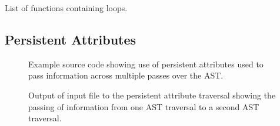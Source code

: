    List of functions containing loops.







\clearpage
\subsection{Persistent Attributes}

\begin{figure}[!h]
{\indent
{\mySmallFontSize


\begin{latexonly}
   
\end{latexonly}

\begin{htmlonly}
   
\end{htmlonly}

}
}
\caption{Example source code showing use of persistent attributes used to pass information
         across multiple passes over the AST.}
\label{Tutorial:examplePersistentAttributes}
\end{figure}


\begin{figure}[!h]
{\indent
{\mySmallFontSize

\begin{latexonly}
   
\end{latexonly}

\begin{htmlonly}
   
\end{htmlonly}

}
}
\caption{Output of input file to the persistent attribute traversal showing the passing of
    information from one AST traversal to a second AST traversal.}
\label{Tutorial:exampleOutput_PersistentAttributes}
\end{figure}

